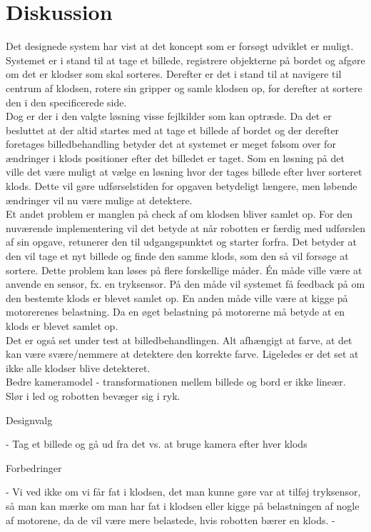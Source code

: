 \clearpage
\section{Diskussion}
Det designede system har vist at det koncept som er forsøgt udviklet er muligt. Systemet er i stand til at tage et billede, registrere objekterne på bordet og afgøre om det er klodser som skal sorteres. Derefter er det i stand til at navigere til centrum af klodsen, rotere sin gripper og samle klodsen op, for derefter at sortere den i den specificerede side.\\

Dog er der i den valgte løsning visse fejlkilder som kan optræde. Da det er besluttet at der altid startes med at tage et billede af bordet og der derefter foretages billedbehandling betyder det at systemet er meget følsom over for ændringer i klods positioner efter det billedet er taget. Som en løsning på det ville det være muligt at vælge en løsning hvor der tages billede efter hver sorteret klods. Dette vil gøre udførselstiden for opgaven betydeligt længere, men løbende ændringer vil nu være mulige at detektere.\\ 

Et andet problem er manglen på check af om klodsen bliver samlet op. For den nuværende implementering vil det betyde at når robotten er færdig med udførslen af sin opgave, retunerer den til udgangspunktet og starter forfra. Det betyder at den vil tage et nyt billede og finde den samme klods, som den så vil forsøge at sortere. Dette problem kan løses på flere forskellige måder. Én måde ville være at anvende en sensor, fx. en tryksensor. På den måde vil systemet få feedback på om den bestemte klods er blevet samlet op. En anden måde ville være at kigge på motorerenes belastning. Da en øget belastning på motorerne må betyde at en klods er blevet samlet op.\\

Det er også set under test at billedbehandlingen. Alt afhængigt at farve, at det kan være svære/nemmere at detektere den korrekte farve. Ligeledes er det set at ikke alle klodser blive detekteret. \\

Bedre kameramodel - transformationen mellem billede og bord er ikke lineær.\\

Slør i led og robotten bevæger sig i ryk.

Designvalg

 - Tag et billede og gå ud fra det vs. at bruge kamera efter hver klods

Forbedringer

 - Vi ved ikke om vi får fat i klodsen, det man kunne gøre var at tilføj tryksensor, så man kan mærke om man har fat i klodsen eller kigge på belastningen af nogle af motorene, da de vil være mere belastede, hvis robotten bærer en klods.
 - 
